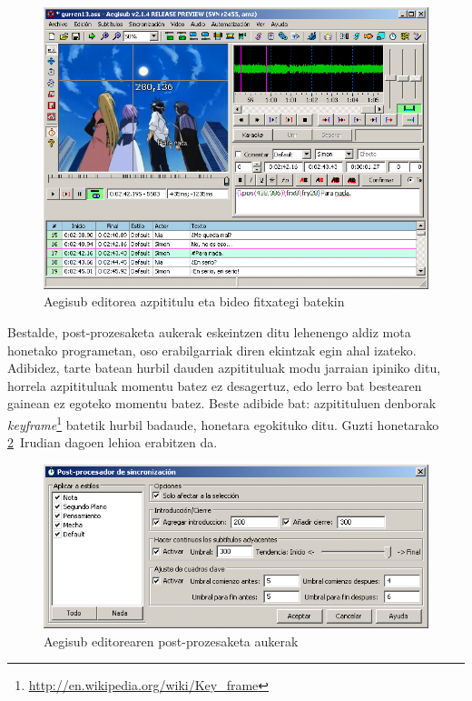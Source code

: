 \begin{figure}[htbp]
\begin{center}
\includegraphics[width=\columnwidth, natwidth=728pt, natheight=532pt]{Pictures/Chapter2/aegisub-bideo.png}
\caption{Aegisub editorea azpititulu eta bideo fitxategi batekin}
\label{aegisub-bideo}
\end{center}
\end{figure}

Bestalde, post-prozesaketa aukerak eskeintzen ditu lehenengo aldiz mota honetako programetan, oso erabilgarriak diren ekintzak egin ahal izateko. Adibidez, tarte batean hurbil dauden azpitituluak modu jarraian ipiniko ditu, horrela azpitituluak momentu batez ez desagertuz, edo lerro bat bestearen gainean ez egoteko momentu batez. Beste adibide bat: azpitituluen denborak \textit{keyframe}\footnote{\url{http://en.wikipedia.org/wiki/Key_frame}} batetik hurbil badaude, honetara egokituko ditu. Guzti honetarako \ref{aegisub-post}~Irudian dagoen lehioa erabitzen da.

\begin{figure}[htbp]
\begin{center}
\includegraphics[width=\columnwidth, natwidth=630pt, natheight=268pt]{Pictures/Chapter2/aegisub-post.png}
\caption{Aegisub editorearen post-prozesaketa aukerak}
\label{aegisub-post}
\end{center}
\end{figure}

